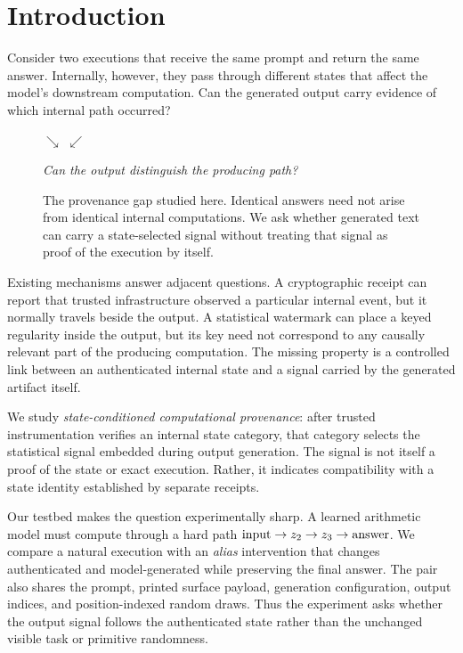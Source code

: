 \section{Introduction}

Consider two executions that receive the same prompt and return the same answer.
Internally, however, they pass through different states that affect the model's
downstream computation. Can the generated output carry evidence of which
internal path occurred?

\begin{figure}[t]
  \centering
  \small
  $\searrow$
  $\swarrow$
  \\[-0.5mm]
  \centerline{\emph{Can the output distinguish the producing path?}}
  \caption{The provenance gap studied here. Identical answers need not arise
  from identical internal computations. We ask whether generated text can
  carry a state-selected signal without treating that signal as proof of the
  execution by itself.}
  \label{fig:problem}
\end{figure}

Existing mechanisms answer adjacent questions. A cryptographic receipt can
report that trusted infrastructure observed a particular internal event, but it
normally travels beside the output. A statistical watermark can place a keyed
regularity inside the output, but its key need not correspond to any causally
relevant part of the producing computation. The missing property is a
controlled link between an authenticated internal state and a signal carried
by the generated artifact itself.

We study \emph{state-conditioned computational provenance}: after trusted
instrumentation verifies an internal state category, that category selects the
statistical signal embedded during output generation. The signal is not itself
a proof of the state or exact execution. Rather, it indicates compatibility
with a state identity established by separate receipts.

Our testbed makes the question experimentally sharp. A learned arithmetic model
must compute through a hard path
$\text{input}\rightarrow z_2\rightarrow z_3\rightarrow\text{answer}$.
We compare a natural execution with an \emph{alias} intervention that changes
authenticated \ztwo{} and model-generated \zthree{} while preserving the final
answer. The pair also shares the prompt, printed surface payload, generation
configuration, output indices, and position-indexed random draws. Thus the
experiment asks whether the output signal follows the authenticated state
rather than the unchanged visible task or primitive randomness.


